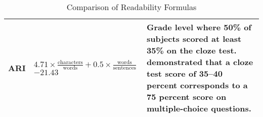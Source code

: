 \begin{table}[ht]
\begin{adjustbox}{width=0.8\textwidth}
\begin{tabular}{|p{4cm}|p{7cm}|p{7cm}|}
\hline
ARI & 
$4.71 \times \frac{\text{characters}}{\text{words}} + 0.5 \times \frac{\text{words}}{\text{sentences}} $
$- 21.43$ & 
Grade level where 50\% of subjects scored at least 35\% on the cloze test. 
\citet{rankin1969comparable} demonstrated that a cloze test score of 35–40 percent corresponds to a 75 percent score on multiple-choice questions.\\

\hline
\end{tabular}
\end{adjustbox}
\caption{Comparison of Readability Formulas}
\label{tab:readability_measures}
\end{table}
